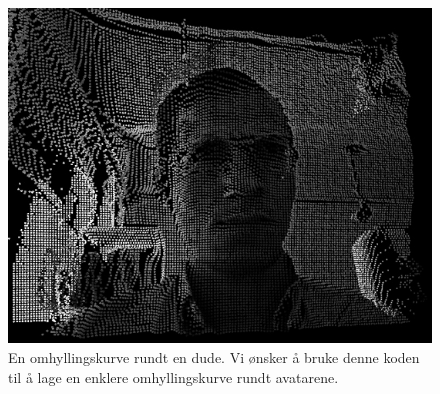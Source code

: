 \documentclass[a4paper,10pt]{article}
\begin{document}
\begin{figure}\centering
 \includegraphics[width = 0.8\linewidth]{hitbox}
 \caption{En omhyllingskurve rundt en dude. Vi ønsker å bruke denne koden til å lage en enklere omhyllingskurve rundt avatarene.}
 \label{fig2}
\end{figure}
\end{document}
